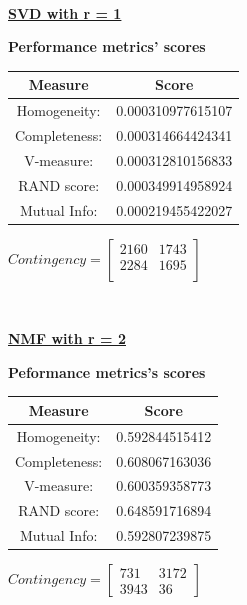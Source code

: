 \documentclass{report}
\begin{document}
\\  \vspace{20pt}


\underline{\textbf{SVD with r = 1}} \\

\begin{center}
	\textbf{Performance metrics' scores} \\  \vspace{10pt} 	
	\begin{tabular}{*{2}{c}}
		\toprule
		\textbf{Measure} & \textbf{Score} \\
		\midrule
		Homogeneity: & 0.000310977615107 \\
		\mdirule 
		Completeness: & 0.000314664424341 \\
		\midrule
		V-measure: & 0.000312810156833  \\
		\midrule
		RAND score: & 0.000349914958924  \\
		\midrule
		Mutual Info:  & 0.000219455422027 \\
		\bottomrule
	\end{tabular}
	\qquad
	$Contingency = \left[\begin{array}{*{2}{c}}
		 2160	& 1743 \\
 		 2284 	& 1695 \\ 
			\end{array}\right]
		$
\end{center}

\\  \vspace{20pt}

\underline{\textbf{NMF with r = 2}} \\
\begin{center}
	\textbf{Peformance metrics's scores} \\  \vspace{10pt}
	\begin{tabular}{*{2}{c}}
		\toprule
		\textbf{Measure} & \textbf{Score} \\
		\midrule
		Homogeneity: & 0.592844515412 \\
		\midrule
		Completeness: & 0.608067163036 \\
		\midrule
		V-measure: 	& 0.600359358773 \\
		\midrule
		RAND score: & 0.648591716894 \\
		\midrule
		Mutual Info:	& 0.592807239875 \\
		\bottomrule
	\end{tabular}
	\qquad	
	$Contingency = \left[\begin{array}{*{2}{c}}
 		731	& 3172 \\
 		3943 & 36 
				\end{array}\right]
	$
\end{center}
\\  \vspace{20pt}
\end{document}
